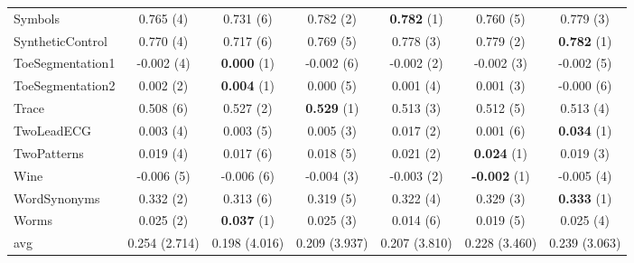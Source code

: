 \begin{table}[ht]
\begin{adjustbox}{width=\textwidth}
\begin{tabular}{lcccccc}
    Symbols & 0.765 (4) & 0.731 (6) & 0.782 (2) & \textbf{0.782} (1) & 0.760 (5) & 0.779 (3) \\
    SyntheticControl & 0.770 (4) & 0.717 (6) & 0.769 (5) & 0.778 (3) & 0.779 (2) & \textbf{0.782} (1) \\
    ToeSegmentation1 & -0.002 (4) & \textbf{0.000} (1) & -0.002 (6) & -0.002 (2) & -0.002 (3) & -0.002 (5) \\
    ToeSegmentation2 & 0.002 (2) & \textbf{0.004} (1) & 0.000 (5) & 0.001 (4) & 0.001 (3) & -0.000 (6) \\
    Trace & 0.508 (6) & 0.527 (2) & \textbf{0.529} (1) & 0.513 (3) & 0.512 (5) & 0.513 (4) \\
    TwoLeadECG & 0.003 (4) & 0.003 (5) & 0.005 (3) & 0.017 (2) & 0.001 (6) & \textbf{0.034} (1) \\
    TwoPatterns & 0.019 (4) & 0.017 (6) & 0.018 (5) & 0.021 (2) & \textbf{0.024} (1) & 0.019 (3) \\
    Wine & -0.006 (5) & -0.006 (6) & -0.004 (3) & -0.003 (2) & \textbf{-0.002} (1) & -0.005 (4) \\
    WordSynonyms & 0.332 (2) & 0.313 (6) & 0.319 (5) & 0.322 (4) & 0.329 (3) & \textbf{0.333} (1) \\
    Worms & 0.025 (2) & \textbf{0.037} (1) & 0.025 (3) & 0.014 (6) & 0.019 (5) & 0.025 (4) \\
    \hline 
    avg & 0.254 (2.714) & 0.198 (4.016) & 0.209 (3.937) & 0.207 (3.810) & 0.228 (3.460) & 0.239 (3.063) \\ 
    \hline
    \end{tabular}
    \end{adjustbox}
    \end{table}
    
    
    
